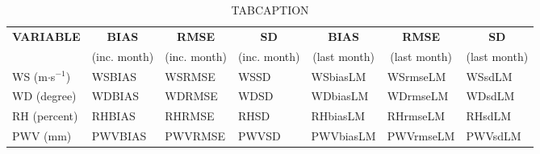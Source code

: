 \begin{table}[h!]
\begin{center}
\begin{tabular}{|l|l|l|l|l|l|l|}
\hline
\multicolumn{1}{|c|}{\cellcolor[HTML]{C0C0C0}\textbf{VARIABLE}} & \multicolumn{1}{c|}{\cellcolor[HTML]{C0C0C0}\textbf{BIAS}} & \multicolumn{1}{c|}{\cellcolor[HTML]{C0C0C0}\textbf{RMSE}} & \multicolumn{1}{c|}{\cellcolor[HTML]{C0C0C0}\textbf{SD}} & \multicolumn{1}{c|}{\cellcolor[HTML]{C0C0C0}\textbf{BIAS}} & \multicolumn{1}{c|}{\cellcolor[HTML]{C0C0C0}\textbf{RMSE}} & \multicolumn{1}{c|}{\cellcolor[HTML]{C0C0C0}\textbf{SD}}\\
\multicolumn{1}{|c|}{\cellcolor[HTML]{C0C0C0}} & \multicolumn{1}{c|}{\cellcolor[HTML]{C0C0C0}(inc. month)} & \multicolumn{1}{c|}{\cellcolor[HTML]{C0C0C0}(inc. month)} & \multicolumn{1}{c|}{\cellcolor[HTML]{C0C0C0}(inc. month)} & \multicolumn{1}{c|}{\cellcolor[HTML]{C0C0C0}(last month)} & \multicolumn{1}{c|}{\cellcolor[HTML]{C0C0C0}(last month)} & \multicolumn{1}{c|}{\cellcolor[HTML]{C0C0C0}(last month)}\\\hline
\cellcolor[HTML]{C0C0C0}WS (m$\cdot$s$^{-1}$) & WSBIAS  & WSRMSE  & WSSD  & WSbiasLM     & WSrmseLM     & WSsdLM\\
\cellcolor[HTML]{C0C0C0}WD (degree)           & WDBIAS  & WDRMSE  & WDSD  & WDbiasLM     & WDrmseLM     & WDsdLM\\
\cellcolor[HTML]{C0C0C0}RH (percent)          & RHBIAS  & RHRMSE  & RHSD  & RHbiasLM     & RHrmseLM     & RHsdLM\\
\cellcolor[HTML]{C0C0C0}PWV (mm)              & PWVBIAS & PWVRMSE & PWVSD & PWVbiasLM    & PWVrmseLM    & PWVsdLM\\
\hline
\end{tabular}
\caption{TABCAPTION}
\end{center}
\end{table}

